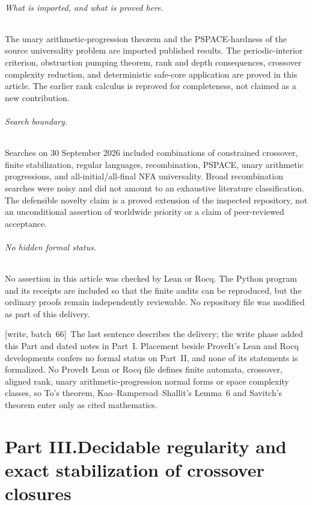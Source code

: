 \documentclass[11pt,letterpaper]{article}
\theoremstyle{definition}
\theoremstyle{remark}
\newcommand{\wsix}{\textup{[write, batch~66]}}
\begin{document}
\paragraph{What is imported, and what is proved here.}
The unary arithmetic-progression theorem and the PSPACE-hardness of the
source universality problem are imported published results. The
periodic-interior criterion, obstruction pumping theorem, rank and depth
consequences, crossover complexity reduction, and deterministic safe-core
application are proved in this article. The earlier rank calculus is
reproved for completeness, not claimed as a new contribution.

\paragraph{Search boundary.}
Searches on 30 September 2026 included combinations of constrained
crossover, finite stabilization, regular languages, recombination,
PSPACE, unary arithmetic progressions, and all-initial/all-final NFA
universality. Broad recombination searches were noisy and did not amount
to an exhaustive literature classification. The defensible novelty claim
is a proved extension of the inspected repository, not an unconditional
assertion of worldwide priority or a claim of peer-reviewed acceptance.

\paragraph{No hidden formal status.}
No assertion in this article was checked by Lean or Rocq. The Python
program and its receipts are included so that the finite audits can be
reproduced, but the ordinary proofs remain independently reviewable.
No repository file was modified as part of this delivery.

\wsix\ The last sentence describes the delivery; the write phase added this
Part and dated notes in Part~I. Placement beside ProveIt's Lean and Rocq
developments confers no formal status on Part~II, and none of its statements
is formalized. No ProveIt Lean or Rocq file defines finite automata,
crossover, aligned rank, unary arithmetic-progression normal forms or space
complexity classes, so To's theorem, Kao--Rampersad--Shallit's Lemma~6 and
Savitch's theorem enter only as cited mathematics.

\clearpage
{}\part*{Part III.\quad Decidable regularity and exact stabilization of crossover closures}
\end{document}
